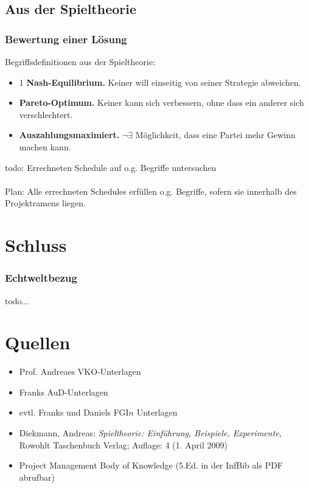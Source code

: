 \documentclass[%
]{beamer}
\begin{document}
	\subsection{Aus der Spieltheorie}
		\begin{frame}
			\frametitle{Bewertung einer Lösung}
			Begriffsdefinitionen aus der Spieltheorie:
			\begin{itemize}
				\item1 \textbf{Nash-Equilibrium.}		Keiner will einseitig von seiner Strategie abweichen.\pause
				\item \textbf{Pareto-Optimum.}			Keiner kann sich verbessern, ohne dass ein anderer sich verschlechtert.\pause
				\item \textbf{Auszahlungsmaximiert.}	$\lnot \exists$ Möglichkeit, dass eine Partei mehr Gewinn machen kann.
			\end{itemize}
		\end{frame}
		\begin{frame}
			todo: Errechneten Schedule auf o.g. Begriffe untersuchen\\
			\-\\
			Plan: Alle errechneten Schedules erfüllen o.g. Begriffe, sofern sie innerhalb des Projektramens liegen.
		\end{frame}
\section{Schluss}
		\begin{frame}
			\frametitle{Echtweltbezug}
			todo...
		\end{frame}
\section{Quellen}
		\begin{frame}
			\begin{itemize}
				\item Prof. Andreaes VKO-Unterlagen
				\item Franks AuD-Unterlagen
				\item evtl. Franks und Daniels FGI$n$ Unterlagen
				\item Diekmann, Andreas: \textit{Spieltheorie: Einführung, Beispiele, Experimente}, Rowohlt Taschenbuch Verlag; Auflage: 4 (1. April 2009)
				\item Project Management Body of Knowledge (5.Ed. in der InfBib als PDF abrufbar)
			\end{itemize}
		\end{frame}
\end{document}
